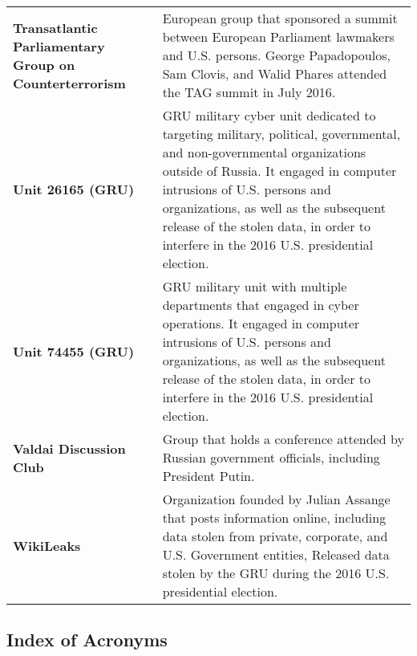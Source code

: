 \begin{longtable}{ p{} p{} }
    \textbf{Transatlantic Parliamentary Group on Counterterrorism} & European group that sponsored a summit between European Parliament lawmakers and U.S. persons. George Papadopoulos, Sam Clovis, and Walid Phares attended the TAG summit in July 2016. \\

    \textbf{Unit 26165 (GRU)} & GRU military cyber unit dedicated to targeting military, political, governmental, and non-governmental organizations outside of Russia. It engaged in computer intrusions of U.S. persons and organizations, as well as the subsequent release of the stolen data, in order to interfere in the 2016 U.S. presidential election. \\

    \textbf{Unit 74455 (GRU)} & GRU military unit with multiple departments that engaged in cyber operations. It engaged in computer intrusions of U.S. persons and organizations, as well as the subsequent release of the stolen data, in order to interfere in the 2016 U.S. presidential election. \\

    \textbf{Valdai Discussion Club} & Group that holds a conference attended by Russian government officials, including President Putin. \\

    \textbf{WikiLeaks} & Organization founded by Julian Assange that posts information online, including data stolen from private, corporate, and U.S. Government entities, Released data stolen by the GRU during the 2016 U.S. presidential election.

\end{longtable}

\subsection{Index of Acronyms}

